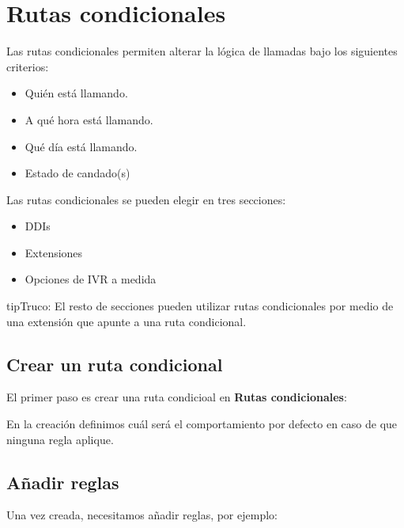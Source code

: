 \documentclass[letterpaper,10pt,spanish]{sphinxmanual}
\begin{document}
\section{Rutas condicionales}
\label{pbx_features/conditional_routes::doc}\label{pbx_features/conditional_routes:conditional-routes}\label{pbx_features/conditional_routes:id1}
Las rutas condicionales permiten alterar la lógica de llamadas bajo los siguientes criterios:
\begin{itemize}
\item {} 
Quién está llamando.

\item {} 
A qué hora está llamando.

\item {} 
Qué día está llamando.

\item {} 
Estado de candado(s)

\end{itemize}

Las rutas condicionales se pueden elegir en tres secciones:
\begin{itemize}
\item {} 
DDIs

\item {} 
Extensiones

\item {} 
Opciones de IVR a medida

\end{itemize}

\begin{notice}{tip}{Truco:}
El resto de secciones pueden utilizar rutas condicionales por medio de una extensión que apunte a una ruta condicional.
\end{notice}


\subsection{Crear un ruta condicional}
\label{pbx_features/conditional_routes:creating-a-conditional-route}
El primer paso es crear una ruta condicioal en \textbf{Rutas condicionales}:

\noindent{}

En la creación definimos cuál será el comportamiento por defecto en caso de que ninguna regla aplique.


\subsection{Añadir reglas}
\label{pbx_features/conditional_routes:adding-rules}
Una vez creada, necesitamos añadir reglas, por ejemplo:
\end{document}
